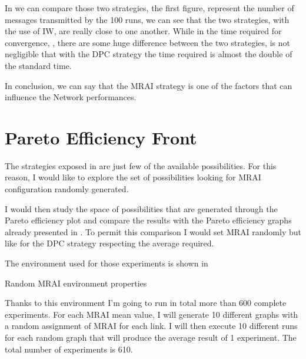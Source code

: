 In  we can compare those two strategies,
the first figure,  represent
the number of messages transmitted by the \num{100} runs, we can see that
the two strategies, with the use of \ac{IW}, are really close to one another.
While in the time required for convergence, ,
there are some huge difference between the two strategies, is not negligible
that with the \ac{DPC} strategy the time required is almost the double of the
standard time.

In conclusion, we can say that the \ac{MRAI} strategy is one of the factors that
can influence the Network performances.


\section{Pareto Efficiency Front}
\label{sec:bgp_mrai_pareto_front}

The strategies exposed in  are just few
of the available possibilities.
For this reason, I would like to explore the set of possibilities looking
for \ac{MRAI} configuration randomly generated.

I would then study the space of possibilities that are generated through the
Pareto efficiency plot and compare the results with the Pareto efficiency
graphs already presented in .
To permit this comparison I would set \ac{MRAI} randomly but like for
the \ac{DPC} strategy respecting the average required.

The environment used for those experiments is shown in 

\begin{table}[h]
	
	\caption{Random \ac{MRAI} environment properties}
	\label{tbl:random_env}
\end{table}

Thanks to this environment I'm going to run in total more than \num{600} complete
experiments.
For each \ac{MRAI} mean value, I will generate \num{10} different graphs with a random
assignment of \ac{MRAI} for each link.
I will then execute \num{10} different runs for each random graph that will produce
the average result of \num{1} experiment.
The total number of experiments is \num{610}.

